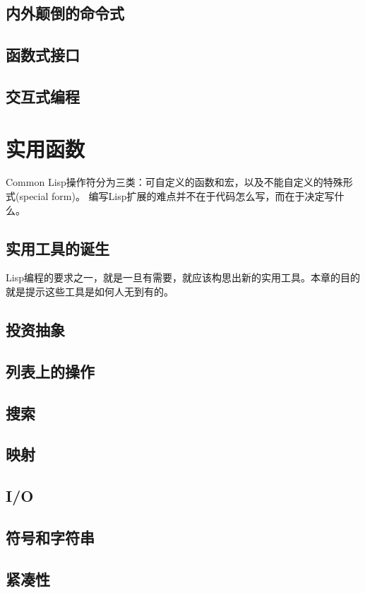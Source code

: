 \documentclass{ctexart}
\begin{document}
\subsection{内外颠倒的命令式}
\label{sec-3-2}
\subsection{函数式接口}
\label{sec-3-3}
\subsection{交互式编程}
\label{sec-3-4}
\section{实用函数}
\label{sec-4}
Common Lisp操作符分为三类：可自定义的函数和宏，以及不能自定义的特殊形式(special form)。
编写Lisp扩展的难点并不在于代码怎么写，而在于决定写什么。
\subsection{实用工具的诞生}
\label{sec-4-1}
Lisp编程的要求之一，就是一旦有需要，就应该构思出新的实用工具。本章的目的就是提示这些工具是如何人无到有的。
\subsection{投资抽象}
\label{sec-4-2}
\subsection{列表上的操作}
\label{sec-4-3}
\subsection{搜索}
\label{sec-4-4}
\subsection{映射}
\label{sec-4-5}
\subsection{I/O}
\label{sec-4-6}
\subsection{符号和字符串}
\label{sec-4-7}
\subsection{紧凑性}
\label{sec-4-8}
\end{document}
